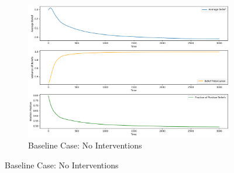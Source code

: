 \documentclass[a4paper,11pt]{scrartcl}
\begin{document}
\begin{figure}[!h]
    \centering
    \begin{subfigure}[b]{0.45\textwidth}
        \centering
        \includegraphics[width=\textwidth]{./images/task4_1.png}
        \caption{Baseline Case: No Interventions}
        \label{fig:task4_1}
    \end{subfigure}
    
    \vspace{0.5cm} 


\end{figure}
\end{document}
